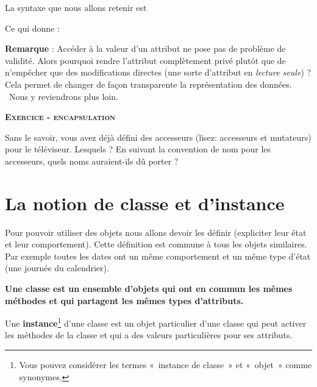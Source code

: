 La syntaxe que nous allons retenir est


\bigskip

Ce qui donne :


\textbf{Remarque} : Accéder à la valeur d’un attribut ne pose pas de
problème de validité. Alors pourquoi rendre l’attribut complètement
privé plutôt que de n’empêcher que des modifications directes (une
sorte d’attribut en \textit{lecture seule}) ? Cela permet de changer de
façon transparente la représentation des données. \ Nous y reviendrons
plus loin.

{\sffamily\bfseries\scshape
Exercice - encapsulation}

Sans le savoir, vous avez déjà défini des accesseurs (lisez: accesseurs
et mutateurs) pour le téléviseur. Lesquels ? En suivant la convention
de nom pour les accesseurs, quels noms auraient-ils dû porter ?


\section{La notion de classe et d'instance}

Pour pouvoir utiliser des objets nous allons devoir les définir
(expliciter leur état et leur comportement). Cette définition est
commune à tous les objets similaires. Par exemple toutes les dates ont
un même comportement et un même type d'état (une
journée du calendrier).

{\sffamily\bfseries\upshape
{
Une \textbf{classe} est un ensemble d'objets qui ont en
commun les mêmes méthodes et qui partagent les mêmes types
d'attributs.}}

Une \textbf{instance}\footnote{Vous pouvez considérer les termes
«~instance de classe~» et «~objet~» comme synonymes. }
d'une classe est un objet particulier
d'une classe qui peut activer les méthodes de la
classe et qui a des valeurs particulières pour ses attributs.

